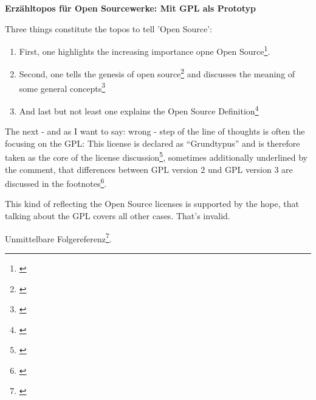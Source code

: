 %
%
%
%

%



\textbf{Erzähltopos für Open Sourcewerke: Mit GPL als Prototyp}

Three things constitute the topos to tell 'Open Source':
\begin{enumerate}
  \item First,  one highlights the increasing importance opne Open
  Source\footnote{\cite[cf.][1ff]{Oberhem2008a}}.
  \item Second, one tells the genesis of open
  source\footnote{\cite[cf.][9]{Oberhem2008a}} and discusses the meaning of some
  general concepts\footnote{\cite[cf.][6ff and 17ff]{Oberhem2008a}}
  \item And last but not least one explains the Open Source
  Definition\footnote{\cite[cf.][10ff]{Oberhem2008a}}
\end{enumerate}

The next - and as I want to say: wrong - step of the line of thoughts is often
the focusing on the GPL: This license is declared as \enquote{Grundtypus}
and is therefore taken as the core of the license
discussion\footnote{\cite[cf.][33]{Oberhem2008a}}, sometimes additionally
underlined by the comment, that differences between GPL version 2 und GPL
version 3 are discussed in the footnotes\footnote{\cite[cf.][34]{Oberhem2008a}}.

This kind of reflecting the Open Source licenses is supported by the hope, that
talking about the GPL covers all other cases. That's invalid.

Unmittelbare Folgereferenz\footnote{\cite[cf.][S.2]{Oberhem2008a}}.


%
